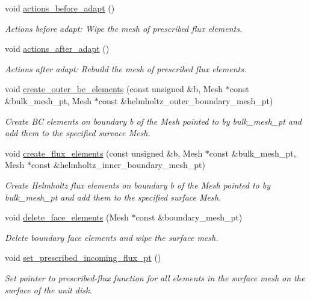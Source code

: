 \begin{DoxyCompactItemize}
void \hyperlink{classScatteringProblem_aca1b756a307f9c1d8a70c7b7e68a296b}{actions\+\_\+before\+\_\+adapt} ()
\begin{DoxyCompactList}\small\item\em Actions before adapt\+: Wipe the mesh of prescribed flux elements. \end{DoxyCompactList}\item 
void \hyperlink{classScatteringProblem_a13d8f85e74666c260de7364917359ed5}{actions\+\_\+after\+\_\+adapt} ()
\begin{DoxyCompactList}\small\item\em Actions after adapt\+: Rebuild the mesh of prescribed flux elements. \end{DoxyCompactList}\item 
void \hyperlink{classScatteringProblem_a408e05fbe1f1456ab7013a7e8ab29ccc}{create\+\_\+outer\+\_\+bc\+\_\+elements} (const unsigned \&b, Mesh $\ast$const \&bulk\+\_\+mesh\+\_\+pt, Mesh $\ast$const \&helmholtz\+\_\+outer\+\_\+boundary\+\_\+mesh\+\_\+pt)
\begin{DoxyCompactList}\small\item\em Create BC elements on boundary b of the Mesh pointed to by bulk\+\_\+mesh\+\_\+pt and add them to the specified survace Mesh. \end{DoxyCompactList}\item 
void \hyperlink{classScatteringProblem_af06ff518ad3250f914c0c659af3001c8}{create\+\_\+flux\+\_\+elements} (const unsigned \&b, Mesh $\ast$const \&bulk\+\_\+mesh\+\_\+pt, Mesh $\ast$const \&helmholtz\+\_\+inner\+\_\+boundary\+\_\+mesh\+\_\+pt)
\begin{DoxyCompactList}\small\item\em Create Helmholtz flux elements on boundary b of the Mesh pointed to by bulk\+\_\+mesh\+\_\+pt and add them to the specified surface Mesh. \end{DoxyCompactList}\item 
void \hyperlink{classScatteringProblem_aaef8a78e317333ddadd0be6a500c1134}{delete\+\_\+face\+\_\+elements} (Mesh $\ast$const \&boundary\+\_\+mesh\+\_\+pt)
\begin{DoxyCompactList}\small\item\em Delete boundary face elements and wipe the surface mesh. \end{DoxyCompactList}\item 
void \hyperlink{classScatteringProblem_ae75307dde909513a0f11057c96cdd622}{set\+\_\+prescribed\+\_\+incoming\+\_\+flux\+\_\+pt} ()
\begin{DoxyCompactList}\small\item\em Set pointer to prescribed-\/flux function for all elements in the surface mesh on the surface of the unit disk. \end{DoxyCompactList}\item 

\end{DoxyCompactItemize}
